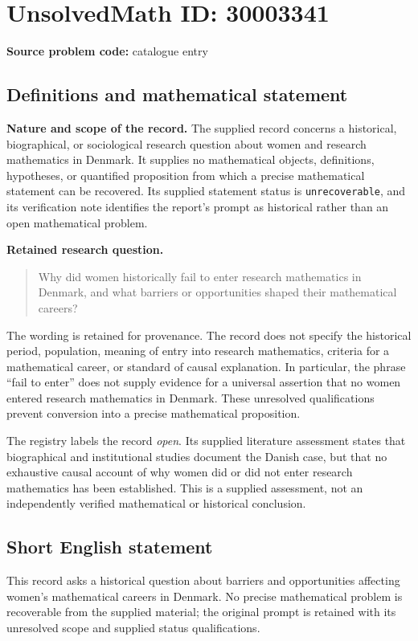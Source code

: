 \documentclass[11pt]{article}
\begin{document}
\section*{UnsolvedMath ID: 30003341}
\textbf{Source problem code:} catalogue entry
\subsection{Definitions and mathematical statement}
\textbf{Nature and scope of the record.} The supplied record concerns a historical, biographical, or sociological research question about women and research mathematics in Denmark. It supplies no mathematical objects, definitions, hypotheses, or quantified proposition from which a precise mathematical statement can be recovered. Its supplied statement status is \texttt{unrecoverable}, and its verification note identifies the report's prompt as historical rather than an open mathematical problem.

\textbf{Retained research question.}
\begin{quote}
Why did women historically fail to enter research mathematics in Denmark, and what barriers or opportunities shaped their mathematical careers?
\end{quote}
The wording is retained for provenance. The record does not specify the historical period, population, meaning of entry into research mathematics, criteria for a mathematical career, or standard of causal explanation. In particular, the phrase ``fail to enter'' does not supply evidence for a universal assertion that no women entered research mathematics in Denmark. These unresolved qualifications prevent conversion into a precise mathematical proposition.

The registry labels the record \emph{open}. Its supplied literature assessment states that biographical and institutional studies document the Danish case, but that no exhaustive causal account of why women did or did not enter research mathematics has been established. This is a supplied assessment, not an independently verified mathematical or historical conclusion.
\subsection{Short English statement}
This record asks a historical question about barriers and opportunities affecting women's mathematical careers in Denmark. No precise mathematical problem is recoverable from the supplied material; the original prompt is retained with its unresolved scope and supplied status qualifications.
\end{document}
